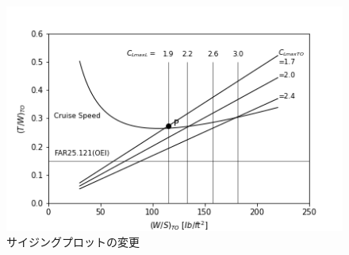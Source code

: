 \documentclass[class=article, crop=false, dvipdfmx, fleqn]{standalone}
\begin{document}
\begin{figure}[H]
  \begin{center}
  \includegraphics[width = 12cm]{../images/sizing.png}
  \caption{サイジングプロットの変更}
  \label{fig::sizing}
\end{center}
\end{figure}
\end{document}
